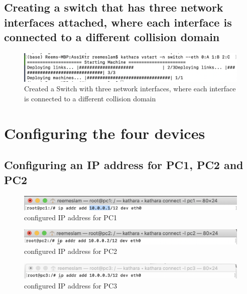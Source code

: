 \subsection{Creating a switch that has three network interfaces attached, where each interface is connected to a different collision domain}

\begin{figure}[H]
\centering
  \includegraphics[width=400pt]{Images/task5.1.2.png}
  \caption{Created a Switch with three network interfaces, where each interface is connected to a different collision domain}
  \label{fig:3.3}
\end{figure}

\section{Configuring the four devices}

\subsection{Configuring an IP address for PC1, PC2 and PC2}
 \begin{figure}[H]
\centering
  \includegraphics[width=500pt]{Images/task5.2.11.png}
  \caption{configured IP address for PC1}
  \label{fig:3.4}
\end{figure}
\begin{figure}[H]
\centering
  \includegraphics[width=500pt]{Images/task5.2.12.png}
  \caption{configured IP address for PC2}
  \label{fig:3.5}
\end{figure}
\begin{figure}[H]
\centering
  \includegraphics[width=500pt]{Images/task5.2.13.png}
  \caption{configured IP address for PC3}
  \label{fig:3.6}
\end{figure}

